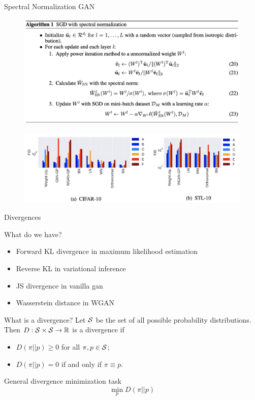 \begin{frame}{Spectral Normalization GAN}
	\begin{figure}
		\centering
		\includegraphics[width=0.85\linewidth]{figs/sngan_pseudocode}
	\end{figure}
	\begin{figure}
		\centering
		\includegraphics[width=0.85\linewidth]{figs/sngan_fids}
	\end{figure}

\end{frame}
\begin{frame}{Divergences}
	\begin{block}{What do we have?}
		\begin{itemize}
			\item Forward KL divergence in maximum likelihood estimation
			\item Reverse KL in variational inference
			\item JS divergence in  vanilla gan
			\item Wasserstein distance in WGAN
		\end{itemize}
	\end{block}
	\begin{block}{What is a divergence?}
		Let $\mathcal{S}$ be the set of all possible probability distributions. Then $D: \mathcal{S} \times \mathcal{S} \rightarrow \mathbb{R}$ is a divergence if 
		\begin{itemize}
			\item $D(\pi || p) \geq 0$ for all $\pi, p \in \mathcal{S}$;
			\item $D(\pi || p) = 0$ if and only if $\pi \equiv p$.
		\end{itemize}
	\end{block}
	\begin{block}{General divergence minimization task}
		\vspace{-0.3cm}
		\[
			\min_p D(\pi || p)
		\]
		\vspace{-0.5cm}
	\end{block}
\end{frame}

